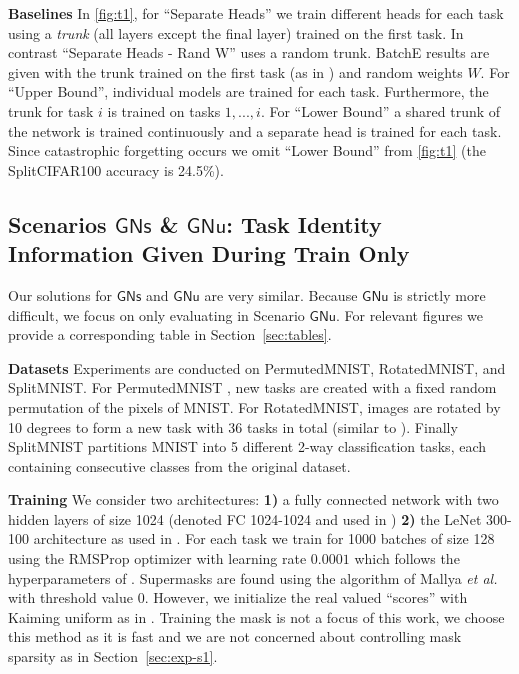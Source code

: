 \documentclass{article}
\newcommand{\casename}[1]{\ensuremath{\mathsf{#1}}\xspace}
\begin{document}
\textbf{Baselines } In \autoref{fig:t1}, for ``Separate Heads'' we train different heads for each task using a \emph{trunk} (all layers except the final layer) trained on the first task. In contrast ``Separate Heads - Rand W'' uses a random trunk. BatchE results are given with the trunk trained on the first task (as in \cite{wen2020batchensemble}) and random weights $W$. For ``Upper Bound'', individual models are trained for each task. Furthermore, the trunk for task $i$ is trained on tasks $1,...,i$. For ``Lower Bound'' a shared trunk of the network is trained continuously and a separate head is trained for each task. Since catastrophic forgetting occurs we omit ``Lower Bound'' from \autoref{fig:t1} (the SplitCIFAR100 accuracy is 24.5\%).

\subsection{Scenarios \casename{GNs} \& \casename{GNu}: Task Identity Information Given During Train Only} \label{sec:exp-s23}
Our solutions for \casename{GNs} and \casename{GNu} are very similar. Because \casename{GNu} is strictly more difficult, we focus on only evaluating in Scenario \casename{GNu}. For relevant figures we provide a corresponding table in Section~\ref{sec:tables}.

\textbf{Datasets } Experiments are conducted on PermutedMNIST, RotatedMNIST, and SplitMNIST. For PermutedMNIST \cite{kirkpatrick2017overcoming}, new tasks are created with a fixed random permutation of the pixels of MNIST. For RotatedMNIST, images are rotated by 10 degrees to form a new task with 36 tasks in total (similar to \cite{cheung2019superposition}). Finally SplitMNIST partitions MNIST into 5 different 2-way classification tasks, each containing consecutive classes from the original dataset.

\textbf{Training } We consider two architectures: \textbf{1)} a fully connected network with two hidden layers of size 1024 (denoted FC 1024-1024 and used in \cite{cheung2019superposition}) \textbf{2)} the LeNet 300-100 architecture \cite{lecun1989backpropagation} as used in \cite{frankle2018lottery, dettmers2019sparse}. 
For each task we train for 1000 batches of size 128 using the RMSProp optimizer \cite{tieleman2012lecture} with learning rate $0.0001$ which follows the hyperparameters of \cite{cheung2019superposition}. Supermasks are found using the algorithm of Mallya \textit{et al.} \cite{mallya2018packnet} with threshold value 0. However, we initialize the real valued ``scores'' with Kaiming uniform as in \cite{ramanujan2019s}. Training the mask is not a focus of this work, we choose this method as it is fast and we are not concerned about controlling mask sparsity as in Section~\ref{sec:exp-s1}.
\end{document}
